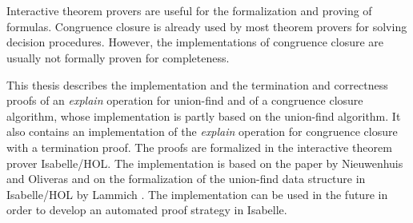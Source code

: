 \chapter{\abstractname}

Interactive theorem provers are useful for the formalization and proving of formulas. Congruence closure is already used by most theorem provers for solving decision procedures. However, the implementations of congruence closure are usually not formally proven for completeness.

This thesis describes the implementation and the termination and correctness proofs  of an \emph{explain} operation for union-find and of a congruence closure algorithm, whose implementation is partly based on the union-find algorithm. It also contains an implementation of the \emph{explain} operation for congruence closure with a termination proof. The proofs are formalized in the interactive theorem prover Isabelle/HOL. The implementation is based on the paper by Nieuwenhuis and Oliveras \cite{Nieuwenhuis} and on the formalization of the union-find data structure in Isabelle/HOL by Lammich \cite{unionfind-isabelle}. The implementation can be used in the future in order to develop an automated proof strategy in Isabelle.